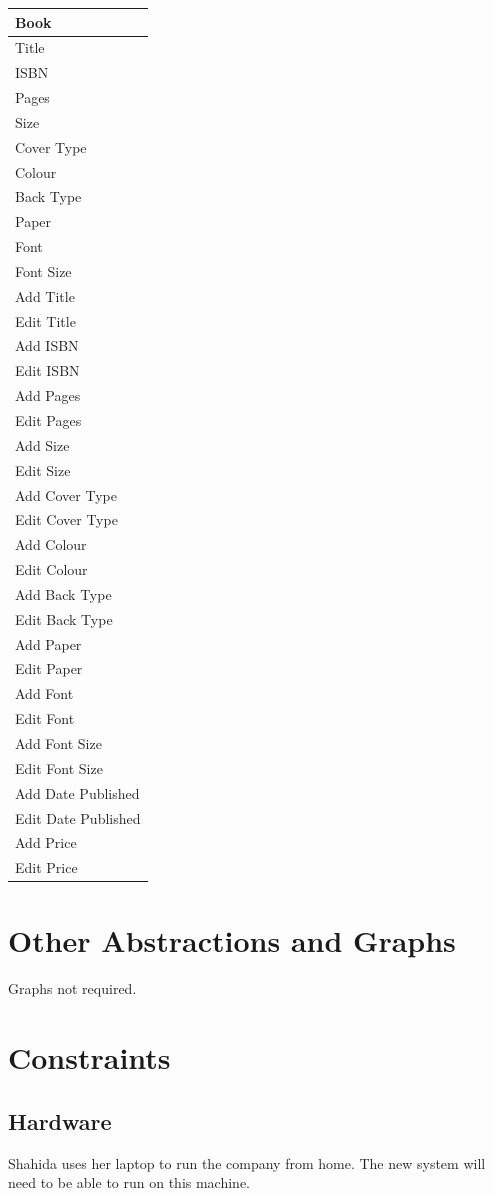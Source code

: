 \begin{tabular}{|p{2.5cm}|}
    \hline
    \textbf{Book} \\ \hline
    Title \\ ISBN \\ Pages \\ Size \\ Cover Type \\ Colour \\ Back Type \\ Paper \\ Font \\ Font Size \\ \hline
    Add Title \\ Edit Title \\ Add ISBN \\ Edit ISBN \\ Add Pages \\ Edit Pages \\ Add Size \\ Edit Size \\ Add Cover Type \\ Edit Cover Type \\ Add Colour \\ Edit Colour \\ Add Back Type \\ Edit Back Type \\ Add Paper \\ Edit Paper \\ Add Font \\ Edit Font \\ Add Font Size \\ Edit Font Size\\ Add Date Published \\ Edit Date Published \\ Add Price \\ Edit Price \\ \hline
    \hline
\end{tabular}

\section{Other Abstractions and Graphs}
Graphs not required.

\section{Constraints}

\subsection{Hardware}
Shahida uses her laptop to run the company from home. The new system will need to be able to run on this machine.

